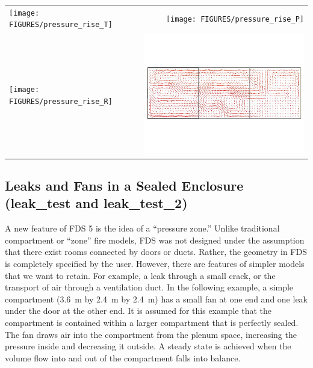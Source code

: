 \documentclass[11pt]{book}
\begin{document}
\noindent
\begin{tabular*}{\textwidth}{lr}
\texttt{[image: FIGURES/pressure\_rise\_T]} &
\texttt{[image: FIGURES/pressure\_rise\_P]} \\
\texttt{[image: FIGURES/pressure\_rise\_R]} &
\includegraphics[width=3.2in]{FIGURES/pressure_rise_1000}
\end{tabular*}




\clearpage

\subsection{Leaks and Fans in a Sealed Enclosure ({\bf leak\_test} and {\bf leak\_test\_2})  }
\label{leak_test}

A new feature of FDS 5 is the idea of a ``pressure zone.''  Unlike traditional compartment or ``zone'' fire models, FDS was not designed under the assumption that there exist
rooms connected by doors or ducts. Rather, the geometry in FDS is completely specified by the user. However, there are features of simpler models that we want to retain. For example,
a leak through a small crack, or the transport of air through a ventilation duct.  In the following example, a simple compartment (3.6~m by 2.4~m by 2.4~m) has a small fan at one
end and one leak under the door at the other end. It is assumed for this example that the compartment is contained within a larger compartment that is perfectly sealed. The fan draws
air into the compartment from the plenum space, increasing the pressure inside and decreasing it outside.  A steady state is achieved when the volume flow into and out of the compartment
falls into balance.
\end{document}
